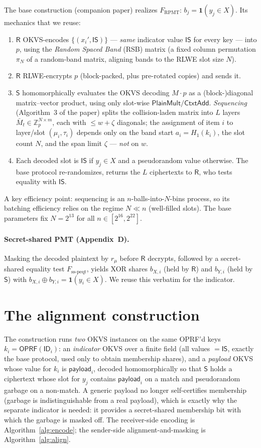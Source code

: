 \documentclass[11pt]{article}
\newcommand{\Rcv}{\mathsf{R}}
\newcommand{\Snd}{\mathsf{S}}
\newcommand{\IS}{\mathsf{IS}}
\newcommand{\PlainMult}{\mathsf{PlainMult}}
\newcommand{\CtxtAdd}{\mathsf{CtxtAdd}}
\newcommand{\OPRF}{\mathsf{OPRF}}
\newcommand{\Zp}{\mathbb{Z}_p}
\theoremstyle{plain}
\theoremstyle{definition}
\begin{document}
The base construction (companion paper) realizes
$F_{\mathrm{RPMT}}$: $b_j=\mathbf{1}(y_j\in X)$. Its mechanics that we reuse:
\begin{enumerate}[leftmargin=*]
  \item $\Rcv$ OKVS-encodes $\{(x_i',\IS)\}$ --- \emph{same} indicator value $\IS$ for
  every key --- into $p$, using the \emph{Random Spaced Band} (RSB) matrix (a fixed column
  permutation $\pi_N$ of a random-band matrix, aligning bands to the RLWE slot size $N$).
  \item $\Rcv$ RLWE-encrypts $p$ (block-packed, plus pre-rotated copies) and sends it.
  \item $\Snd$ homomorphically evaluates the OKVS decoding $M\cdot p$ as a
  (block-)diagonal matrix--vector product, using only slot-wise $\PlainMult/\CtxtAdd$.
  \emph{Sequencing} (Algorithm~3 of the paper) splits the collision-laden matrix into $L$
  layers $\bar M_t\in\Zp^{N\times m}$, each with $\le w+\zeta$ diagonals; the assignment of
  item $i$ to layer/slot $(\mu_i,\tau_i)$ depends only on the band start
  $a_i=H_1(k_i)$, the slot count $N$, and the span limit $\zeta$ --- \emph{not} on $w$.
  \item Each decoded slot is $\IS$ if $y_j\in X$ and a pseudorandom value otherwise. The
  base protocol re-randomizes, returns the $L$ ciphertexts to $\Rcv$, who tests equality
  with $\IS$.
\end{enumerate}
A key efficiency point: sequencing is an $n$-balls-into-$N$-bins process, so its batching
efficiency relies on the regime $N\ll n$ (well-filled slots). The base parameters fix
$N=2^{13}$ for all $n\in[2^{16},2^{22}]$.

\paragraph{Secret-shared PMT (Appendix~D).} Masking the decoded plaintext by $r_\mu$ before
$\Rcv$ decrypts, followed by a secret-shared equality test $F_{\mathrm{ss\text{-}peqt}}$,
yields XOR shares $b_{X,i}$ (held by $\Rcv$) and $b_{Y,i}$ (held by $\Snd$) with
$b_{X,i}\oplus b_{Y,i}=\mathbf 1(y_i\in X)$. We reuse this verbatim for the indicator.

\section{The alignment construction}

The construction runs \emph{two} OKVS instances on the same OPRF'd keys
$k_i=\OPRF(\mathsf{ID}_i)$: an \emph{indicator} OKVS over a finite field (all values $=\IS$,
exactly the base protocol, used only to obtain membership shares), and a \emph{payload}
OKVS whose value for $k_i$ is $\mathsf{payload}_i$, decoded homomorphically so that $\Snd$
holds a ciphertext whose slot for $y_j$ contains $\mathsf{payload}_i$ on a match and
pseudorandom garbage on a non-match. A generic payload no longer self-certifies membership
(garbage is indistinguishable from a real payload), which is exactly why the separate
indicator is needed: it provides a secret-shared membership bit with which the garbage is
masked off. The receiver-side encoding is Algorithm~\ref{alg:encode}; the sender-side
alignment-and-masking is Algorithm~\ref{alg:align}.
\end{document}
